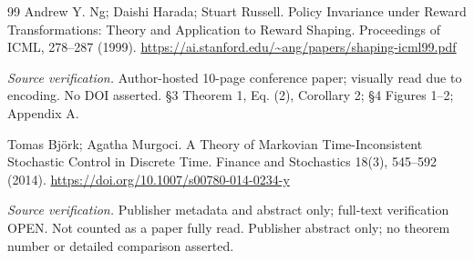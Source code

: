 \documentclass[11pt,a4paper]{article}
\theoremstyle{plain}
\theoremstyle{definition}
\theoremstyle{remark}
\begin{document}
\begin{thebibliography}{99}
 Andrew Y. Ng; Daishi Harada; Stuart Russell. Policy Invariance under Reward Transformations: Theory and Application to Reward Shaping. Proceedings of ICML, 278--287 (1999). \url{https://ai.stanford.edu/~ang/papers/shaping-icml99.pdf}
\par\smallskip\noindent\emph{Source verification.} Author-hosted 10-page conference paper; visually read due to encoding. No DOI asserted. \S{}3 Theorem 1, Eq. (2), Corollary 2; \S{}4 Figures 1--2; Appendix A.

 Tomas Björk; Agatha Murgoci. A Theory of Markovian Time-Inconsistent Stochastic Control in Discrete Time. Finance and Stochastics 18(3), 545--592 (2014). \url{https://doi.org/10.1007/s00780-014-0234-y}
\par\smallskip\noindent\emph{Source verification.} Publisher metadata and abstract only; full-text verification OPEN. Not counted as a paper fully read. Publisher abstract only; no theorem number or detailed comparison asserted.

\end{thebibliography}
\end{document}
